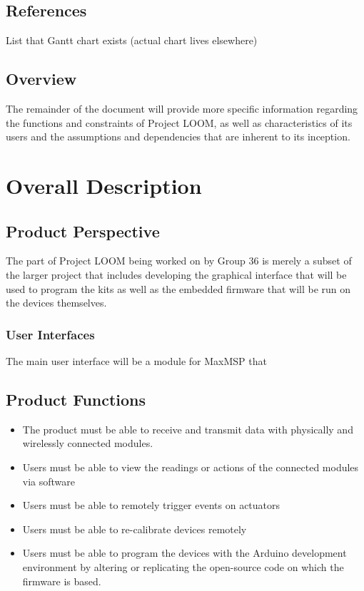 \documentclass[onecolumn, draftclsnofoot,10pt, compsoc]{IEEEtran}
\begin{document}
	\subsection{References}
	List that Gantt chart exists (actual chart lives elsewhere)
	\subsection{Overview}
	The remainder of the document will provide more specific information regarding the functions and constraints of Project LOOM, as well as characteristics of its users and the assumptions and dependencies that are inherent to its inception. 

\section{Overall Description}
	\subsection{Product Perspective}
	The part of Project LOOM being worked on by Group 36 is merely a subset of the larger project that includes developing the graphical interface that will be used to program the kits as well as the embedded firmware that will be run on the devices themselves.

	\subsubsection{User Interfaces}
	The main user interface will be a module for MaxMSP that 
	\subsection{Product Functions}
		\begin{itemize}
		\item The product must be able to receive and transmit data with physically and wirelessly connected modules.
		\item Users must be able to view the readings or actions of the connected modules via software
		\item Users must be able to remotely trigger events on actuators
		\item Users must be able to re-calibrate devices remotely
		\item Users must be able to program the devices with the Arduino development environment by altering or replicating the open-source code on which the firmware is based.
		\end{itemize}
\end{document}
